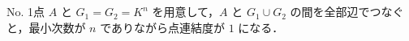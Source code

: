 \subsection{}
No. 1点 $A$ と $G_1 = G_2 = K^n$ を用意して，$A$ と $G_1\cup G_2$ の間を全部辺でつなぐと，最小次数が $n$ でありながら点連結度が $1$ になる．

